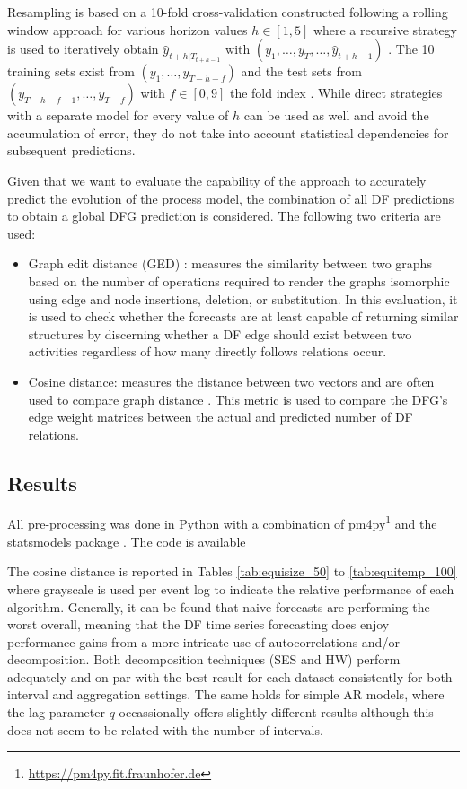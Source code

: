 Resampling is based on a 10-fold cross-validation constructed following a rolling window approach for various horizon values $h\in[1,5]$ where a recursive strategy is used to iteratively obtain $\hat{y}_{t+h|T_{t+h-1}}$ with $(y_1,\dots,y_{T},\dots,\hat{y}_{t+h-1})$ \cite{weigend2018time}.
The 10 training sets exist from $(y_1,\dots,y_{T-h-f})$ and the test sets from\\ $(y_{T-h-f+1},\dots,y_{T-f})$ with $f\in[0,9]$ the fold index \cite{bergmeir2012use}.
While direct strategies with a separate model for every value of $h$ can be used as well and avoid the accumulation of error, they do not take into account statistical dependencies for subsequent predictions.

Given that we want to evaluate the capability of the approach to accurately predict the evolution of the process model, the combination of all DF predictions to obtain a global DFG prediction is considered.
The following two criteria are used:
\begin{itemize}
	\item Graph edit distance (GED) \cite{gao2010survey}: measures the similarity between two graphs based on the number of operations required to render the graphs isomorphic using edge and node insertions, deletion, or substitution.
	In this evaluation, it is used to check whether the forecasts are at least capable of returning similar structures by discerning whether a DF edge should exist between two activities regardless of how many directly follows relations occur.
	\item Cosine distance: measures the distance between two vectors and are often used to compare graph distance . This metric is used to compare the DFG's edge weight matrices between the actual and predicted number of DF relations.
\end{itemize}

\subsection{Results}
All pre-processing was done in Python with a combination of pm4py\footnote{\url{https://pm4py.fit.fraunhofer.de}} and the statsmodels package \cite{seabold2010statsmodels}. 
The code is available %

The cosine distance is reported in Tables \ref{tab:equisize_50} to \ref{tab:equitemp_100} where grayscale is used per event log to indicate the relative performance of each algorithm.
Generally, it can be found that naive forecasts are performing the worst overall, meaning that the DF time series forecasting does enjoy performance gains from a more intricate use of autocorrelations and/or decomposition.
Both decomposition techniques (SES and HW) perform adequately and on par with the best result for each dataset consistently for both interval and aggregation settings.
The same holds for simple AR models, where the lag-parameter $q$ occassionally offers slightly different results although this does not seem to be related with the number of intervals.




